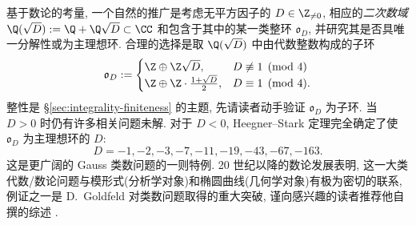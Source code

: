 基于数论的考量, 一个自然的推广是考虑无平方因子的 $D \in \Z_{\neq 0}$, 相应的\emph{二次数域} $\Q(\sqrt{D}) := \Q + \Q\sqrt{D} \subset \CC$ 和包含于其中的某一类整环 $\mathfrak{o}_D$, 并研究其是否具唯一分解性或为主理想环. 合理的选择是取 $\Q(\sqrt{D})$ 中由代数整数构成的子环
\begin{equation}\label{eqn:quadratic-integer} \mathfrak{o}_D := \begin{cases}
	\Z \oplus \Z \sqrt{D}, & D \not\equiv 1 \pmod 4 \\
	\Z \oplus \Z \cdot \frac{1 + \sqrt{D}}{2}, & D \equiv 1 \pmod 4.
\end{cases}\end{equation}
整性是 \S\ref{sec:integrality-finiteness} 的主题, 先请读者动手验证 $\mathfrak{o}_D$ 为子环. 当 $D>0$ 时仍有许多相关问题未解. 对于 $D < 0$, Heegner--Stark 定理完全确定了使 $\mathfrak{o}_D$ 为主理想环的 $D$:
\[ D = -1, -2, -3, -7, -11, -19, -43, -67, -163. \]
这是更广阔的 Gauss 类数问题的一则特例. 20 世纪以降的数论发展表明, 这一大类代数/数论问题与模形式(分析学对象)和椭圆曲线(几何学对象)有极为密切的联系, 例证之一是 D.\ Goldfeld 对类数问题取得的重大突破, 谨向感兴趣的读者推荐他自撰的综述 \cite{Go85}.

